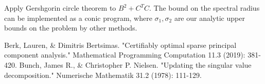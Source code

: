 \documentclass{article}
\begin{document}
Apply Gershgorin circle theorem to $B^2 + C^T C$. The bound on the spectral radius can be implemented as a conic program, where $\sigma_1,\sigma_2$ are our analytic upper bounds on the problem by other methods.






\begin{thebibliography}{9}
     Berk, Lauren, \& Dimitris Bertsimas. "Certifiably optimal sparse principal component analysis." Mathematical Programming Computation 11.3 (2019): 381-420.
     Bunch, James R., \& Christopher P. Nielsen. "Updating the singular value decomposition." Numerische Mathematik 31.2 (1978): 111-129.
\end{thebibliography}
\end{document}
